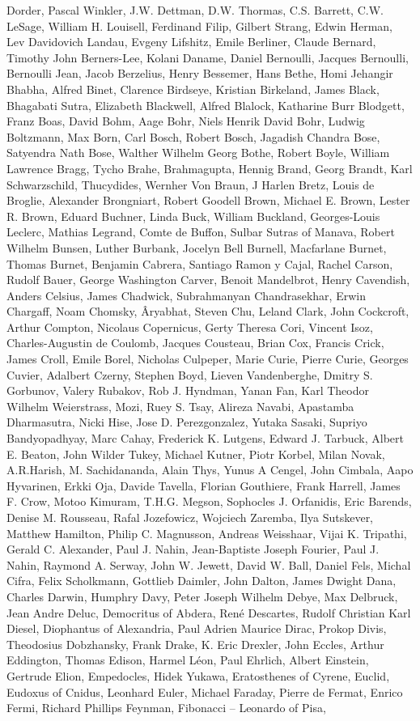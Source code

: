 \begin{spacing}{0.5}
\begin{tiny}
Dorder, Pascal Winkler, J.W. Dettman, D.W. Thormas, C.S. Barrett, C.W. LeSage, William H. Louisell, Ferdinand Filip, Gilbert Strang, Edwin Herman, Lev Davidovich Landau, Evgeny Lifshitz, Emile Berliner, Claude Bernard, Timothy John Berners-Lee, Kolani Daname, Daniel Bernoulli, Jacques Bernoulli, Bernoulli Jean, Jacob Berzelius, Henry Bessemer, Hans Bethe, Homi Jehangir Bhabha, Alfred Binet, Clarence Birdseye, Kristian Birkeland, James Black, Bhagabati Sutra, Elizabeth Blackwell, Alfred Blalock, Katharine Burr Blodgett, Franz Boas, David Bohm, Aage Bohr, Niels Henrik David Bohr, Ludwig Boltzmann, Max Born, Carl Bosch, Robert Bosch, Jagadish Chandra Bose, Satyendra Nath Bose, Walther Wilhelm Georg Bothe, Robert Boyle, William Lawrence Bragg, Tycho Brahe, Brahmagupta, Hennig Brand, Georg Brandt, Karl Schwarzschild, Thucydides, Wernher Von Braun, J Harlen Bretz, Louis de Broglie, Alexander Brongniart, Robert Goodell Brown, Michael E. Brown, Lester R. Brown, Eduard Buchner, Linda Buck, William Buckland, Georges-Louis Leclerc, Mathias Legrand, Comte de Buffon, Sulbar Sutras of Manava, Robert Wilhelm Bunsen, Luther Burbank, Jocelyn Bell Burnell, Macfarlane Burnet, Thomas Burnet, Benjamin Cabrera, Santiago Ramon y Cajal, Rachel Carson, Rudolf Bauer, George Washington Carver, Benoit Mandelbrot, Henry Cavendish, Anders Celsius, James Chadwick, Subrahmanyan Chandrasekhar, Erwin Chargaff, Noam Chomsky, Âryabhat, Steven Chu, Leland Clark, John Cockcroft, Arthur Compton, Nicolaus Copernicus, Gerty Theresa Cori, Vincent Isoz, Charles-Augustin de Coulomb, Jacques Cousteau, Brian Cox, Francis Crick, James Croll, Emile Borel, Nicholas Culpeper, Marie Curie, Pierre Curie, Georges Cuvier, Adalbert Czerny, Stephen Boyd, Lieven Vandenberghe, Dmitry S. Gorbunov, Valery Rubakov, Rob J. Hyndman, Yanan Fan, Karl Theodor Wilhelm Weierstrass, Mozi, Ruey S. Tsay, Alireza Navabi, Apastamba Dharmasutra, Nicki Hise, Jose D. Perezgonzalez, Yutaka Sasaki, Supriyo Bandyopadhyay, Marc Cahay, Frederick K. Lutgens, Edward J. Tarbuck, Albert E. Beaton, John Wilder Tukey, Michael Kutner, Piotr Korbel, Milan Novak, A.R.Harish, M. Sachidananda, Alain Thys, Yunus A Cengel, John Cimbala, Aapo Hyvarinen, Erkki Oja, Davide Tavella, Florian Gouthiere, Frank Harrell, James F. Crow, Motoo Kimuram, T.H.G. Megson, Sophocles J. Orfanidis, Eric Barends, Denise M. Rousseau, Rafal Jozefowicz, Wojciech Zaremba, Ilya Sutskever, Matthew Hamilton, Philip C. Magnusson, Andreas Weisshaar, Vijai K. Tripathi, Gerald C. Alexander, Paul J. Nahin, Jean-Baptiste Joseph Fourier, Paul J. Nahin, Raymond A. Serway, John W. Jewett, David W. Ball, Daniel Fels, Michal Cifra, Felix Scholkmann, Gottlieb Daimler, John Dalton, James Dwight Dana, Charles Darwin, Humphry Davy, Peter Joseph Wilhelm Debye, Max Delbruck, Jean Andre Deluc, Democritus of Abdera, René Descartes, Rudolf Christian Karl Diesel, Diophantus of Alexandria, Paul Adrien Maurice Dirac, Prokop Divis, Theodosius Dobzhansky, Frank Drake, K. Eric Drexler, John Eccles, Arthur Eddington, Thomas Edison, Harmel Léon, Paul Ehrlich, Albert Einstein, Gertrude Elion, Empedocles, Hidek Yukawa, Eratosthenes of Cyrene, Euclid, Eudoxus of Cnidus, Leonhard Euler, Michael Faraday, Pierre de Fermat, Enrico Fermi, Richard Phillips Feynman, Fibonacci – Leonardo of Pisa, 
\end{tiny}
\end{spacing}

